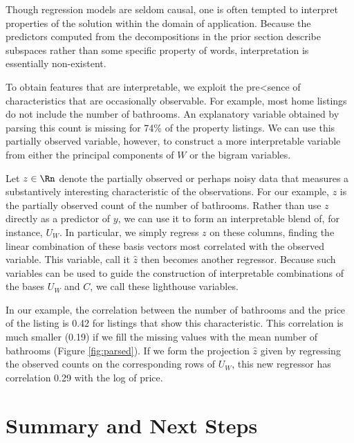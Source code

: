 \documentclass[12pt]{article}
\begin{document}
Though regression models are seldom causal, one is often tempted to interpret
 properties of the solution within the domain of application.  Because the
 predictors computed from the decompositions in the prior section describe
 subspaces rather than some specific property of words, interpretation is
 essentially non-existent.


 To obtain features that are interpretable, we exploit the pre<sence of
 characteristics that are occasionally observable.  For example,
 most home listings do not include the number of bathrooms.  An
 explanatory variable obtained by parsing this count is missing for 74\% of the property listings.  We can use this partially observed variable, however, to construct a more interpretable variable from either the principal components of $W$ or the bigram variables.  


 Let $z \in \Rn$ denote the partially observed or perhaps noisy data
 that measures a substantively interesting characteristic of the
 observations.  For our example, $z$ is the partially observed count of the number of bathrooms.  Rather than use $z$ directly as a predictor of $y$, we
 can use it to form an interpretable blend of, for instance, $U_W$.   In
 particular, we simply regress $z$ on these columns, finding the
 linear combination of these basis vectors most correlated with the
 observed variable.  This variable, call it $\hat{z}$ then becomes
 another regressor.  Because such variables can be used to guide the
 construction of interpretable combinations of the bases $U_W$ and
 $C$, we call these lighthouse variables.  
 
 
 In our example, the correlation between the number of bathrooms and the price of the listing is 0.42 for listings that show this characteristic.  This correlation is much smaller (0.19) if we fill the missing values with the mean number of bathrooms (Figure  \ref{fig:parsed}).  If we form the projection $\hat{z}$ given by regressing the observed counts on the corresponding rows of $U_W$, this new regressor has correlation 0.29 with the log of price.



\section{Summary and Next Steps}
\label{sec:disc}
  
\end{document}

